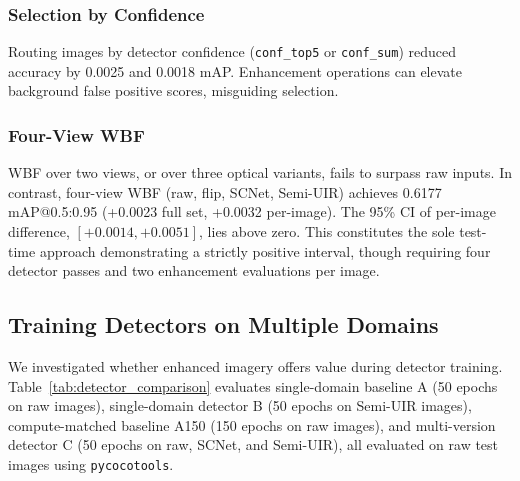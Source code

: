 \documentclass[runningheads]{llncs}
\begin{document}
\subsubsection{Selection by Confidence}
Routing images by detector confidence (\texttt{conf\_top5} or \texttt{conf\_sum}) reduced accuracy by 0.0025 and 0.0018 mAP. Enhancement operations can elevate background false positive scores, misguiding selection.

\subsubsection{Four-View WBF}
WBF over two views, or over three optical variants, fails to surpass raw inputs. In contrast, four-view WBF (raw, flip, SCNet, Semi-UIR) achieves 0.6177 mAP@0.5:0.95 (+0.0023 full set, +0.0032 per-image). The 95\% CI of per-image difference, $[+0.0014, +0.0051]$, lies above zero. This constitutes the sole test-time approach demonstrating a strictly positive interval, though requiring four detector passes and two enhancement evaluations per image.

\subsection{Training Detectors on Multiple Domains}
\label{sec:res-domains}

We investigated whether enhanced imagery offers value during detector training. Table~\ref{tab:detector_comparison} evaluates single-domain baseline A (50 epochs on raw images), single-domain detector B (50 epochs on Semi-UIR images), compute-matched baseline A150 (150 epochs on raw images), and multi-version detector C (50 epochs on raw, SCNet, and Semi-UIR), all evaluated on raw test images using \texttt{pycocotools}.

\begin{table}[t]
    \centering
    \caption{Comparison of YOLO11n detectors evaluated on raw RUOD test images (\texttt{pycocotools}).}
    \label{tab:detector_comparison}
\end{table}
\end{document}
